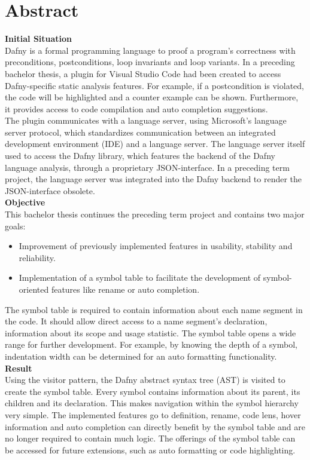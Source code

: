 \section{Abstract}
\label{section:abstract}

\textbf{Initial Situation}\\
Dafny is a formal programming language to proof a program's correctness with preconditions, postconditions, loop invariants and loop variants.
In a preceding bachelor thesis, a plugin for Visual Studio Code had been created to access Dafny-specific static analysis features.
For example, if a postcondition is violated, the code will be highlighted and a counter example can be shown.
Furthermore, it provides access to code compilation and auto completion suggestions.\\

The plugin communicates with a language server, using Microsoft's language server protocol, which standardizes communication between an integrated development environment (IDE) and a language server. 
The language server itself used to access the Dafny library, which features the backend of the Dafny language analysis, through a proprietary JSON-interface.
In a preceding term project, the language server was integrated into the Dafny backend to render the JSON-interface obsolete.\\

\textbf{Objective}\\
This bachelor thesis continues the preceding term project and contains two major goals:
\begin{itemize}
    \item Improvement of previously implemented features in usability, stability and reliability.
    \item Implementation of a symbol table to facilitate the development of symbol-oriented features like rename or auto completion.
\end{itemize}
The symbol table is required to contain information about each name segment in the code.
It should allow direct access to a name segment's declaration, information about its scope and usage statistic.
The symbol table opens a wide range for further development.
For example, by knowing the depth of a symbol, indentation width can be determined for an auto formatting functionality.\\

\textbf{Result}\\
Using the visitor pattern, the Dafny abstract syntax tree (AST) is visited to create the symbol table.
Every symbol contains information about its parent, its children and its declaration.
This makes navigation within the symbol hierarchy very simple.
The implemented features go to definition, rename, code lens, hover information and auto completion can directly benefit by the symbol table and are no longer required to contain much logic.
The offerings of the symbol table can be accessed for future extensions, such as auto formatting or code highlighting.\\


